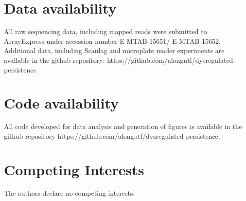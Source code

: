 \documentclass[12pt]{article}
\begin{document}
\section*{Data availability}
All raw sequencing data, including mapped reads were submitted to ArrayExpress under accession number E-MTAB-15651/ E-MTAB-15652. Additional data, including Scanlag and microplate reader experiments are available in the github repository:
\newline
https://github.com/alongutf/dysregulated-persistence
\section*{Code availability}
All code developed for data analysis and generation of figures is available in the github repository https://github.com/alongutf/dysregulated-persistence.
\section*{Competing Interests}
The authors declare no competing interests.


%

%
\end{document}
